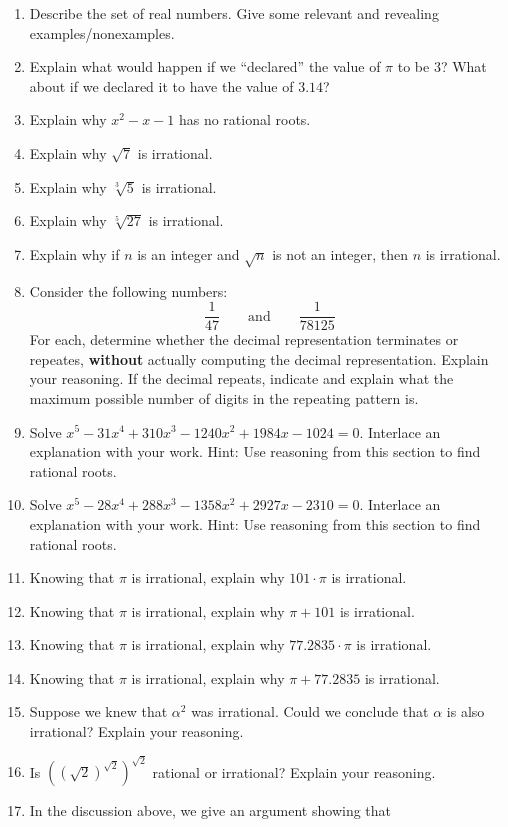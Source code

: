 \begin{problems}
\begin{enumerate}
\item Describe the set of real numbers. Give some relevant and
  revealing examples/nonexamples.
\item Explain what would happen if we ``declared'' the value of $\pi$
  to be $3$? What about if we declared it to have the value of $3.14$?
\item Explain why $x^2 - x - 1$ has no rational roots. 
\item Explain why $\sqrt{7}$ is irrational.
\item Explain why $\sqrt[3]{5}$ is irrational.
\item Explain why $\sqrt[5]{27}$ is irrational.
\item Explain why if $n$ is an integer and $\sqrt{n}$ is not an
  integer, then $n$ is irrational.
\item Consider the following numbers:
\[
\frac{1}{47} \qquad\text{and}\qquad \frac{1}{78125}
\]
For each, determine whether the decimal representation terminates or
repeates, \textbf{without} actually computing the decimal
representation. Explain your reasoning. If the decimal repeats,
indicate and explain what the maximum possible number of digits in the
repeating pattern is.
\item Solve $x^5 - 31x^4 +310x^3 -1240 x^2 + 1984x-1024= 0$. Interlace
  an explanation with your work. Hint: Use reasoning from this section
  to find rational roots.
\item Solve $x^5 - 28x^4 +288x^3 - 1358 x^2 + 2927 x -2310 =
  0$. Interlace an explanation with your work. Hint: Use reasoning
  from this section to find rational roots.
\item Knowing that $\pi$ is irrational, explain why $101\cdot\pi$ is
  irrational.
\item Knowing that $\pi$ is irrational, explain why $\pi + 101$ is
  irrational.
\item Knowing that $\pi$ is irrational, explain why $77.2835\cdot\pi$ is
  irrational.
\item Knowing that $\pi$ is irrational, explain why $\pi + 77.2835$ is
  irrational.
\item Suppose we knew that $\alpha^2$ was irrational. Could we
  conclude that $\alpha$ is also irrational? Explain your reasoning.
\item Is $((\sqrt{2})^{\sqrt{2}})^{\sqrt{2}}$ rational or irrational?
  Explain your reasoning.
\item In the discussion above, we give an argument showing that

\end{enumerate}
\end{problems}
